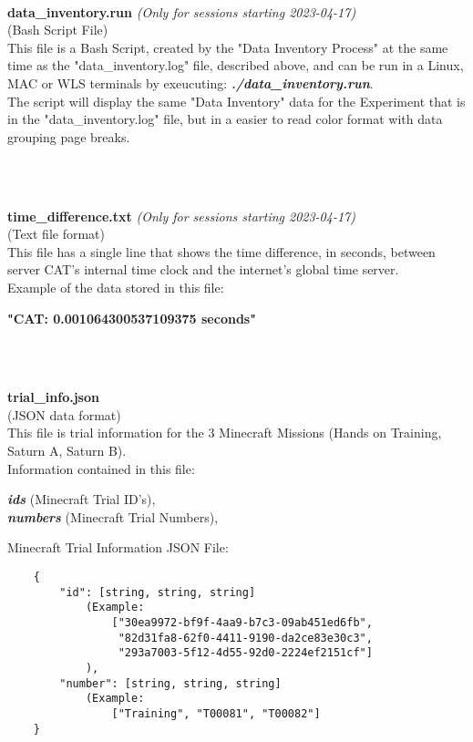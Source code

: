\begin{description}
\textbf{\\}
\item
{}\label{data_inventory.run}
\textbf{data\_inventory.run} \textit{(Only for sessions starting 2023-04-17)}\\
(Bash Script File)\\
This file is a Bash Script, created by the "Data Inventory Process" at the same time as
the "data\_inventory.log" file, described above, and can be run in a Linux, MAC or WLS terminals by exeucuting: 
\textit{\textbf{./data\_inventory.run}}.\\
The script will display the same "Data Inventory" data for the Experiment that is in the "data\_inventory.log" file,
but in a easier to read color format with data grouping page breaks.


\textbf{\\\\}
\item
{}\label{time_difference.txt}
\textbf{time\_difference.txt} \textit{(Only for sessions starting 2023-04-17)}\\
(Text file format)\\
This file has a single line that shows the time difference, in seconds,
between server CAT's internal time clock and the internet's global time server.\\
Example of the data stored in this file:
\begin{addmargin}[1em]{0em}
    \textbf{"CAT: 0.001064300537109375 seconds"}
\end{addmargin}


\textbf{\\\\}
\item
{}\label{trial_info.json}
\textbf{trial\_info.json}\\(JSON data format)\\
This file is trial information for the 3 Minecraft Missions (Hands on Training, Saturn A, Saturn B).\\
Information contained in this file:
\begin{addmargin}[1em]{0em}
    \textbf{\textit{ids}} (Minecraft Trial ID's),\\
    \textbf{\textit{numbers}} (Minecraft Trial Numbers),\\
\end{addmargin}
Minecraft Trial Information JSON File:
\begin{verbatim}
    {
        "id": [string, string, string]
            (Example:
                ["30ea9972-bf9f-4aa9-b7c3-09ab451ed6fb",
                 "82d31fa8-62f0-4411-9190-da2ce83e30c3",
                 "293a7003-5f12-4d55-92d0-2224ef2151cf"]
            ),
        "number": [string, string, string]
            (Example:
                ["Training", "T00081", "T00082"]
    }
\end{verbatim}


\end{description}
